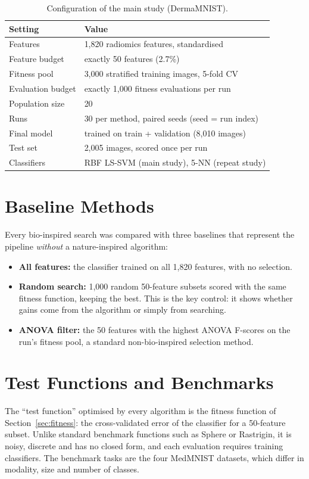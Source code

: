 \documentclass[12pt,a4paper]{report}
\begin{document}
\begin{table}[H]
\centering
\caption{Configuration of the main study (DermaMNIST).}
\label{tab:config}
\small
\begin{tabular}{|l|l|}
\hline
\textbf{Setting} & \textbf{Value} \\
\hline
Features & 1,820 radiomics features, standardised \\
Feature budget & exactly 50 features (2.7\%) \\
Fitness pool & 3,000 stratified training images, 5-fold CV \\
Evaluation budget & exactly 1,000 fitness evaluations per run \\
Population size & 20 \\
Runs & 30 per method, paired seeds (seed = run index) \\
Final model & trained on train + validation (8,010 images) \\
Test set & 2,005 images, scored once per run \\
Classifiers & RBF LS-SVM (main study), 5-NN (repeat study) \\
\hline
\end{tabular}
\end{table}

\section{Baseline Methods}
Every bio-inspired search was compared with three baselines that represent the pipeline \emph{without} a
nature-inspired algorithm:
\begin{itemize}
  \item \textbf{All features:} the classifier trained on all 1,820 features, with no selection.
  \item \textbf{Random search:} 1,000 random 50-feature subsets scored with the same fitness function, keeping the
        best. This is the key control: it shows whether gains come from the algorithm or simply from searching.
  \item \textbf{ANOVA filter:} the 50 features with the highest ANOVA F-scores on the run's fitness pool, a standard
        non-bio-inspired selection method.
\end{itemize}

\section{Test Functions and Benchmarks}
The ``test function'' optimised by every algorithm is the fitness function of Section~\ref{sec:fitness}: the
cross-validated error of the classifier for a 50-feature subset. Unlike standard benchmark functions such as Sphere
or Rastrigin, it is noisy, discrete and has no closed form, and each evaluation requires training classifiers. The
benchmark tasks are the four MedMNIST datasets, which differ in modality, size and number of classes.
\end{document}
